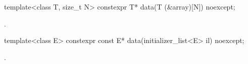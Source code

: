 %
\begin{itemdecl}
template<class T, size_t N> constexpr T* data(T (&array)[N]) noexcept;
\end{itemdecl}
\begin{itemdescr}
\pnum \returns {}.
\end{itemdescr}

%
\begin{itemdecl}
template<class E> constexpr const E* data(initializer_list<E> il) noexcept;
\end{itemdecl}
\begin{itemdescr}
\pnum \returns {}.
\end{itemdescr}
